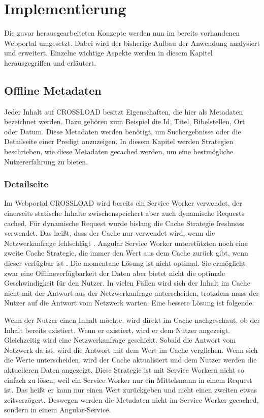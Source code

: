 \chapter{Implementierung}
\label{Kap5}
Die zuvor herausgearbeiteten Konzepte werden nun im bereits vorhandenen Webportal umgesetzt. Dabei wird der bisherige Aufbau der Anwendung analysiert und erweitert. Einzelne wichtige Aspekte werden in diesem Kapitel herausgegriffen und erläutert.

\section{Offline Metadaten}
Jeder Inhalt auf CROSSLOAD besitzt Eigenschaften, die hier als Metadaten bezeichnet werden. Dazu gehören zum Beispiel die Id, Titel, Bibelstellen, Ort oder Datum. Diese Metadaten werden benötigt, um Suchergebnisse oder die Detailseite einer Predigt anzuzeigen. In diesem Kapitel werden Strategien beschrieben, wie diese Metadaten gecached werden, um eine bestmögliche Nutzererfahrung zu bieten.

\subsection{Detailseite}
Im Webportal CROSSLOAD wird bereits ein Service Worker verwendet, der einerseits statische Inhalte zwischenspeichert aber auch dynamische Requests cached. Für dynamische Request wurde bislang die Cache Strategie freshness verwendet. Das heißt, dass der Cache nur verwendet wird, wenn die Netzwerkanfrage fehlschlägt \autocite{angular-service-worker}. Angular Service Worker unterstützten noch eine zweite Cache Strategie, die immer den Wert aus dem Cache zurück gibt, wenn dieser verfügbar ist \autocite{angular-service-worker}. Die momentane Lösung ist nicht optimal. Sie ermöglicht zwar eine Offlineverfügbarkeit der Daten aber bietet nicht die optimale Geschwindigkeit für den Nutzer. In vielen Fällen wird sich der Inhalt im Cache nicht mit der Antwort aus der Netzwerkanfrage unterscheiden, trotzdem muss der Nutzer auf die Antwort vom Netzwerk warten. Eine bessere Lösung ist folgende:

Wenn der Nutzer einen Inhalt möchte, wird direkt im Cache nachgeschaut, ob der Inhalt bereits existiert. Wenn er existiert, wird er dem Nutzer angezeigt. Gleichzeitig wird eine Netzwerkanfrage geschickt. Sobald die Antwort vom Netzwerk da ist, wird die Antwort mit dem Wert im Cache verglichen. Wenn sich die Werte unterscheiden, wird der Cache aktualisiert und dem Nutzer werden die aktuelleren Daten angezeigt. Diese Strategie ist mit Service Workern nicht so einfach zu lösen, weil ein Service Worker nur ein Mittelsmann in einem Request ist. Das heißt er kann nur einen Wert zurückgeben und nicht einen zweiten etwas zeitverzögert. Deswegen werden die Metadaten nicht im Service Worker gecached, sondern in einem Angular-Service.

